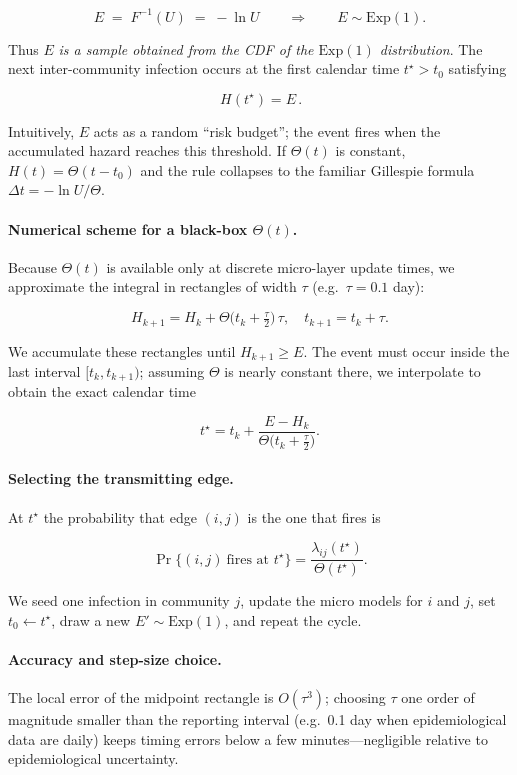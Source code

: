 \documentclass[
]{ceurart}
\newcommand{\Exp}{\mathrm{Exp}}
\begin{document}
\[
E \;=\; F^{-1}(U)\;=\;-\ln U
\qquad\Longrightarrow\qquad
E\sim\mathrm{Exp}(1).
\]

Thus \(E\) \emph{is a sample obtained from the CDF of the
\(\mathrm{Exp}(1)\) distribution}.  
The next inter-community infection occurs at the first calendar time
\(t^\star>t_0\) satisfying

\[
\,H(t^\star)=E\,.
\]

Intuitively, \(E\) acts as a random “risk budget”; the event fires when
the accumulated hazard reaches this threshold.  If \(\Theta(t)\) is
constant, \(H(t)=\Theta (t-t_0)\) and the rule collapses to the familiar
Gillespie formula \(\Delta t=-\ln U/\Theta\).


\paragraph{Numerical scheme for a black-box \(\Theta(t)\).}
Because \(\Theta(t)\) is available only at discrete micro-layer update
times, we approximate the integral in rectangles of width \(\tau\)
(e.g.\ \(\tau=0.1\) day):

\[
  H_{k+1}=H_k+\Theta\!\bigl(t_k+\tfrac{\tau}{2}\bigr)\,\tau,
  \quad  t_{k+1}=t_k+\tau.
\]

We accumulate these rectangles until \(H_{k+1}\ge E\).
The event must occur inside the last interval
\([t_k,t_{k+1})\); assuming \(\Theta\) is nearly constant there, we
interpolate to obtain the exact calendar time

\[
  t^\star
  = t_k
    +\frac{E-H_k}{\Theta\bigl(t_k+\tfrac{\tau}{2}\bigr)}.
\]

\paragraph{Selecting the transmitting edge.}
At \(t^\star\) the probability that edge \((i,j)\) is the one that fires
is

\[
  \Pr\bigl\{(i,j)\ \text{fires at }t^\star\bigr\}
  =\frac{\lambda_{ij}(t^\star)}{\Theta(t^\star)}.
\]

We seed one infection in community \(j\), update the micro models for
\(i\) and \(j\), set \(t_0\leftarrow t^\star\), draw a new
\(E'\sim\Exp(1)\), and repeat the cycle.

\paragraph{Accuracy and step-size choice.}
The local error of the midpoint rectangle is
\(O(\tau^{3})\); choosing \(\tau\) one order of magnitude
smaller than the reporting interval (e.g.\ 0.1 day when epidemiological
data are daily) keeps timing errors below a few minutes—negligible
relative to epidemiological uncertainty.
\end{document}
